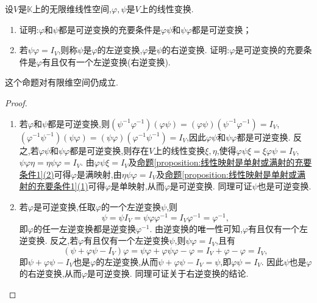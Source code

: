 \documentclass[../../main.tex]{subfiles}%
\begin{document}
\begin{proposition}\label{proposition:无限维线性空间的可逆线性变换充要条件1}
设\(V\)是\(\mathbb{K}\)上的无限维线性空间,\(\varphi,\psi\)是\(V\)上的线性变换.
\begin{enumerate}[(1)]
\item 证明:\(\varphi\)和\(\psi\)都是可逆变换的充要条件是\(\varphi\psi\)和\(\psi\varphi\)都是可逆变换；

\item 若\(\psi\varphi = I_V\),则称\(\psi\)是\(\varphi\)的左逆变换,\(\varphi\)是\(\psi\)的右逆变换. 证明:\(\varphi\)是可逆变换的充要条件是\(\varphi\)有且仅有一个左逆变换(右逆变换).
\end{enumerate}
\end{proposition}
\begin{note}
这个命题对有限维空间仍成立.
\end{note}
\begin{proof}
\begin{enumerate}[(1)]
\item 若\(\varphi\)和\(\psi\)都是可逆变换,则\((\psi^{-1}\varphi^{-1})(\varphi\psi)=(\varphi\psi)(\psi^{-1}\varphi^{-1}) = I_V\),\((\varphi^{-1}\psi^{-1})(\psi\varphi)=(\psi\varphi)(\varphi^{-1}\psi^{-1}) = I_V\),因此\(\varphi\psi\)和\(\psi\varphi\)都是可逆变换. 反之,若\(\varphi\psi\)和\(\psi\varphi\)都是可逆变换,则存在\(V\)上的线性变换\(\xi,\eta\),使得\(\varphi\psi\xi=\xi\varphi\psi = I_V\),\(\psi\varphi\eta=\eta\psi\varphi = I_V\). 由\(\varphi\psi\xi = I_V\)及\hyperref[proposition:线性映射是单射或满射的充要条件1]{命题\ref{proposition:线性映射是单射或满射的充要条件1}(2)}可得\(\varphi\)是满映射,由\(\eta\psi\varphi = I_V\)及\hyperref[proposition:线性映射是单射或满射的充要条件1]{命题\ref{proposition:线性映射是单射或满射的充要条件1}(1)}可得\(\varphi\)是单映射,从而\(\varphi\)是可逆变换. 同理可证\(\psi\)也是可逆变换.

\item 若\(\varphi\)是可逆变换,任取\(\varphi\)的一个左逆变换\(\psi\),则
\[
\psi=\psi I_V=\psi\varphi\varphi^{-1}=I_V\varphi^{-1}=\varphi^{-1},
\]
即\(\varphi\)的任一左逆变换都是逆变换\(\varphi^{-1}\). 由逆变换的唯一性可知,\(\varphi\)有且仅有一个左逆变换. 反之,若\(\varphi\)有且仅有一个左逆变换\(\psi\),则\(\psi\varphi = I_V\),且有
\[
(\psi+\varphi\psi - I_V)\varphi=\psi\varphi+\varphi\psi\varphi-\varphi=I_V+\varphi-\varphi=I_V,
\]
即\(\psi+\varphi\psi - I_V\)也是\(\varphi\)的左逆变换,从而\(\psi+\varphi\psi - I_V=\psi\),即\(\varphi\psi = I_V\). 因此\(\psi\)也是\(\varphi\)的右逆变换,从而\(\varphi\)是可逆变换. 同理可证关于右逆变换的结论.
\end{enumerate}
\end{proof}
\end{document}
